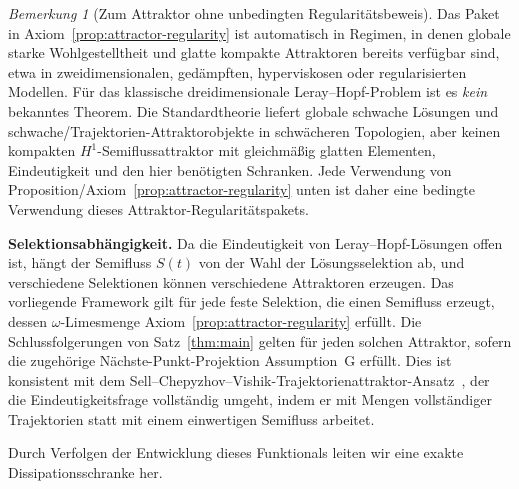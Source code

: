 \documentclass[12pt,a4paper]{article}
\theoremstyle{definition}
\theoremstyle{plain}
\theoremstyle{remark}
\newtheorem{remark}[definition]{Bemerkung}
\begin{document}
\begin{remark}[Zum Attraktor ohne unbedingten Regularitätsbeweis]
\label{rem:circularity}
Das Paket in Axiom~\ref{prop:attractor-regularity} ist automatisch in
Regimen, in denen globale starke Wohlgestelltheit und glatte kompakte
Attraktoren bereits verfügbar sind, etwa in zweidimensionalen,
gedämpften, hyperviskosen oder regularisierten Modellen. Für das
klassische dreidimensionale Leray--Hopf-Problem ist es \emph{kein}
bekanntes Theorem. Die Standardtheorie liefert globale schwache
Lösungen und schwache/Trajektorien-Attraktorobjekte in schwächeren
Topologien, aber keinen kompakten $H^1$-Semiflussattraktor mit
gleichmäßig glatten Elementen, Eindeutigkeit und den hier benötigten
Schranken. Jede Verwendung von Proposition/Axiom~\ref{prop:attractor-regularity}
unten ist daher eine bedingte Verwendung dieses Attraktor-Regularitätspakets.

\medskip\noindent
\textbf{Selektionsabhängigkeit.}\;
Da die Eindeutigkeit von Leray--Hopf-Lösungen offen ist, hängt der
Semifluss $S(t)$ von der Wahl der Lösungsselektion ab, und
verschiedene Selektionen können verschiedene Attraktoren erzeugen.
Das vorliegende Framework gilt für jede feste Selektion, die einen
Semifluss erzeugt, dessen $\omega$-Limesmenge
Axiom~\ref{prop:attractor-regularity} erfüllt. Die Schlussfolgerungen von
Satz~\ref{thm:main} gelten für jeden solchen Attraktor, sofern
die zugehörige Nächste-Punkt-Projektion Assumption~G erfüllt.
Dies ist konsistent mit dem Sell--Chepyzhov--Vishik-Trajektorienattraktor-Ansatz~\cite{ChepyzhovVishik2002}, der die Eindeutigkeitsfrage
vollständig umgeht, indem er mit Mengen vollständiger Trajektorien
statt mit einem einwertigen Semifluss arbeitet.
\end{remark}

Durch Verfolgen der Entwicklung dieses Funktionals leiten wir eine exakte Dissipationsschranke her.
\end{document}
